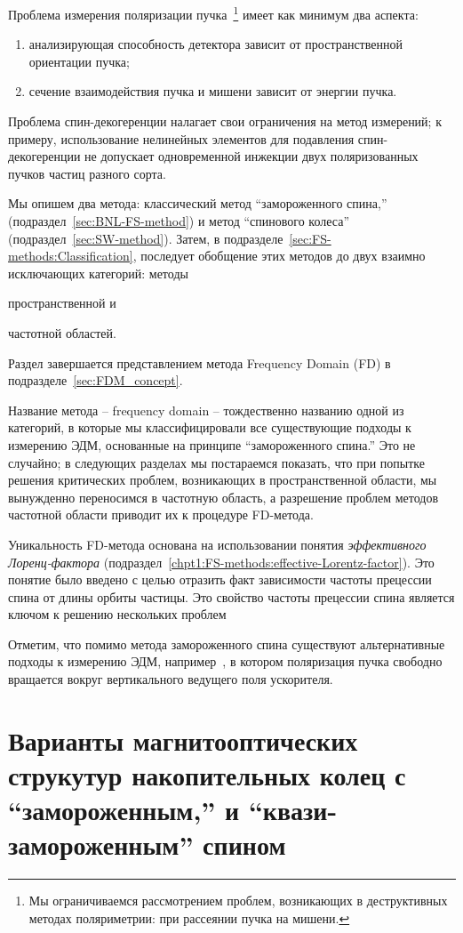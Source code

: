 Проблема измерения поляризации пучка~\footnote{
	Мы ограничиваемся рассмотрением проблем, 
	возникающих в деструктивных методах поляриметрии: при рассеянии пучка на мишени.}  
имеет как минимум два аспекта:
\begin{enumerate}[(1)]
	\item анализирующая способность детектора зависит от пространственной ориентации пучка;
	\item сечение взаимодействия пучка и мишени зависит от энергии пучка.
\end{enumerate}

Проблема спин-декогеренции налагает свои ограничения на метод измерений; к примеру, 
использование нелинейных элементов для подавления 
спин-декогеренции не допускает одновременной инжекции двух поляризованных пучков 
частиц разного сорта. 

Мы опишем два метода: классический метод ``замороженного спина,'' (подраздел~\ref{sec:BNL-FS-method}) 
и метод ``спинового колеса'' (подраздел~\ref{sec:SW-method}). 
Затем, в подразделе~\ref{sec:FS-methods:Classification}, последует обобщение этих методов 
до двух взаимно исключающих категорий: методы
\begin{enumerate*}
	\item пространственной и
	\item частотной областей.
\end{enumerate*}
Раздел завершается представлением метода Frequency Domain (FD) в подразделе~\ref{sec:FDM_concept}. 

Название метода -- frequency domain -- тождественно названию одной из категорий, 
в которые мы классифицировали все существующие подходы к измерению ЭДМ, основанные на 
принципе ``замороженного спина.''
Это не случайно; в следующих разделах мы постараемся показать, что при попытке  решения 
критических проблем, возникающих в пространственной области, мы вынужденно переносимся 
в частотную область, а разрешение проблем методов частотной области приводит их к процедуре FD-метода.

Уникальность FD-метода основана на использовании понятия \emph{эффективного Лоренц-фактора}
 (подраздел~\ref{chpt1:FS-methods:effective-Lorentz-factor}). Это понятие было введено с целью отразить
 факт зависимости частоты прецессии спина от длины орбиты частицы. Это свойство частоты прецессии спина
 является ключом к решению нескольких проблем

Отметим, что помимо метода замороженного спина существуют альтернативные подходы к измерению ЭДМ, например~\cite{COSY:SpinTuneMapping, COSY:Partially-Frozen-Spin}, в котором поляризация пучка свободно вращается вокруг вертикального ведущего поля ускорителя.



\section{Варианты магнитооптических струкутур накопительных колец с ``замороженным,'' и ``квази-замороженным'' спином} \label{chpt1:Lattices}



\clearpage